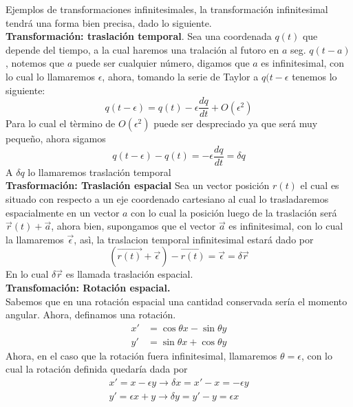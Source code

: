 \documentclass[../main.tex]{subfiles}
\begin{document}
Ejemplos de transformaciones infinitesimales, la transformación infinitesimal tendrá una forma bien precisa, dado lo siguiente. \\
\textbf{Transformación: traslación temporal}. Sea una coordenada $q(t)$ que depende del tiempo, a la cual haremos una tralación al futoro en $a$ seg. $q(t-a)$, notemos que $a $ puede ser cualquier número, digamos que $a$ es infinitesimal, con lo cual lo llamaremos $\epsilon$, ahora, tomando la serie de Taylor a $q(t-\epsilon$ tenemos lo siguiente:
\begin{equation}
    q(t-\epsilon)=q(t) - \epsilon \frac{dq}{dt}+ O(\epsilon^2)
\end{equation}
Para lo cual el tèrmino de $O(\epsilon^2)$ puede ser despreciado ya que será muy pequeño, ahora sigamos
\begin{equation}
    q(t-\epsilon)-q(t) =- \epsilon \frac{dq}{dt}=\delta q
\end{equation}
A $\delta q$ lo llamaremos traslación temporal \\
\textbf{Trasformación: Traslación espacial}
Sea un vector posición $r(t)$ el cual es situado con respecto a un eje coordenado cartesiano al cual lo trasladaremos espacialmente en un vector $a$ con lo cual la posición luego de la traslación será $\vec{r}(t)+\vec{a}$, ahora bien, supongamos que el vector $\vec{a}$ es infinitesimal, con lo cual la llamaremos $\vec{\epsilon}$, asì, la traslacion temporal infinitesimal estará dado por
\begin{equation}
    (\vec{r(t)}+\vec{\epsilon} )- \vec{r(t)}=\vec{\epsilon}=\delta \vec{r}
\end{equation}
En lo cual $\delta \vec{r}$ es llamada traslación espacial. \\
\textbf{Transfomación: Rotación espacial.} \\ Sabemos que en una rotación espacial una cantidad conservada sería el momento angular. Ahora, definamos una rotación.
\begin{align}
    x \prime &  = \cos{\theta}x- \sin{\theta}y \\
    y \prime &  = \sin{\theta}x + \cos{\theta}y
\end{align}
Ahora, en el caso que la rotación fuera infinitesimal, llamaremos $\theta=\epsilon$, con lo cual la rotación definida quedaría dada por
\begin{align}
    x \prime = x- \epsilon y \xrightarrow{} \delta x = x \prime - x = -\epsilon y \\
    y \prime  = \epsilon x + y \xrightarrow{} \delta y = y \prime  - y = \epsilon x
\end{align}
\end{document}
